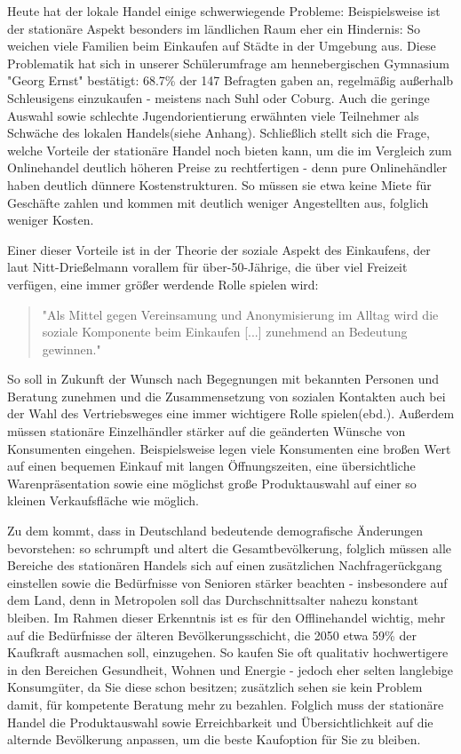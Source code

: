 \begin{folding}
Heute hat der lokale Handel einige schwerwiegende Probleme: 
Beispielsweise ist der stationäre Aspekt besonders im ländlichen Raum eher ein Hindernis: So weichen viele Familien beim Einkaufen auf Städte in der Umgebung aus. Diese Problematik hat sich in unserer Schülerumfrage am hennebergischen Gymnasium "Georg Ernst" bestätigt: 68.7\% der 147 Befragten gaben an, regelmäßig außerhalb Schleusigens einzukaufen - meistens nach Suhl oder Coburg. 
Auch die geringe Auswahl sowie schlechte Jugendorientierung erwähnten viele Teilnehmer als Schwäche des lokalen Handels(siehe Anhang). Schließlich stellt sich die Frage, welche Vorteile der stationäre Handel noch bieten kann, um die im Vergleich zum Onlinehandel deutlich höheren Preise zu rechtfertigen - denn pure Onlinehändler haben deutlich dünnere Kostenstrukturen\cite[S. 14]{evilcom}. So müssen sie etwa keine Miete für Geschäfte zahlen und kommen mit deutlich weniger Angestellten aus, folglich weniger Kosten. 

Einer dieser Vorteile ist in der Theorie der soziale Aspekt des Einkaufens, der laut Nitt-Drießelmann vorallem für über-50-Jährige, die über viel Freizeit verfügen, eine immer größer werdende Rolle spielen wird\cite[S. 43f]{Nitt}:
\begin{quote}
"Als Mittel gegen Vereinsamung und Anonymisierung im Alltag wird die soziale Komponente beim Einkaufen [...] zunehmend an Bedeutung gewinnen."\cite[S. 43]{Nitt}
\end{quote} 
So soll in Zukunft der Wunsch nach Begegnungen mit bekannten Personen und Beratung zunehmen und die Zusammensetzung von sozialen Kontakten auch bei der Wahl des Vertriebsweges eine immer wichtigere Rolle spielen(ebd.).
Außerdem müssen stationäre Einzelhändler stärker auf die geänderten Wünsche von Konsumenten eingehen. Beispielsweise legen viele Konsumenten eine broßen Wert auf einen bequemen Einkauf mit langen Öffnungszeiten, eine übersichtliche Warenpräsentation sowie eine möglichst große Produktauswahl auf einer so kleinen Verkaufsfläche wie möglich\cite[S. 61]{Nitt}.

Zu dem kommt, dass in Deutschland bedeutende demografische Änderungen bevorstehen: so schrumpft und altert die Gesamtbevölkerung, folglich müssen alle Bereiche des stationären Handels sich auf einen zusätzlichen Nachfragerückgang einstellen sowie die Bedürfnisse von Senioren stärker beachten - insbesondere auf dem Land, denn in Metropolen soll das Durchschnittsalter nahezu konstant bleiben\cite[S. 32ff]{Nitt}. Im Rahmen dieser Erkenntnis ist es für den Offlinehandel wichtig, mehr auf die Bedürfnisse der älteren Bevölkerungsschicht, die 2050 etwa 59\% der Kaufkraft ausmachen soll, einzugehen\cite[S. 64]{Nitt}. So kaufen Sie oft qualitativ hochwertigere in den Bereichen Gesundheit, Wohnen und Energie - jedoch eher selten langlebige Konsumgüter, da Sie diese schon besitzen; zusätzlich sehen sie kein Problem damit, für kompetente Beratung mehr zu bezahlen\cite[S. 41f]{Nitt}. Folglich muss der stationäre Handel die Produktauswahl sowie Erreichbarkeit und Übersichtlichkeit auf die alternde Bevölkerung anpassen, um die beste Kaufoption für Sie zu bleiben\cite[S. 64]{Nitt}.


\end{folding}
